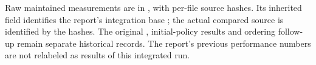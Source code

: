 Raw maintained measurements are in
, with per-file source hashes.
Its inherited  field identifies the report's integration
base ; the actual compared source is identified by the hashes.
The original , initial-policy results and ordering
follow-up remain separate historical records. The report's previous performance
numbers are not relabeled as results of this integrated run.
